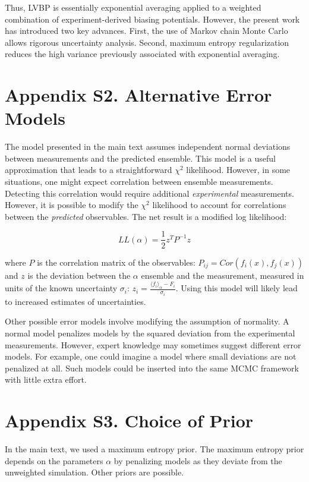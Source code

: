 \documentclass[journal=jacsat,manuscript=article]{achemso}
\begin{document}
Thus, LVBP is essentially exponential averaging applied to a weighted combination of experiment-derived biasing potentials.  However, the present work has introduced two key advances.  First, the use of Markov chain Monte Carlo allows rigorous uncertainty analysis.  Second, maximum entropy regularization reduces the high variance previously associated with exponential averaging.  

\section{Appendix S2.  Alternative Error Models}

The model presented in the main text assumes independent normal deviations between measurements and the predicted ensemble.  This model is a useful approximation that leads to a straightforward $\chi^2$ likelihood.  However, in some situations, one might expect correlation between ensemble measurements.  Detecting this correlation would require additional \emph{experimental} measurements.  However, it is possible to modify the $\chi^2$ likelihood to account for correlations between the \emph{predicted} observables.  The net result is a modified log likelihood:

$$L L(\alpha) = \frac{1}{2} z^T P^{-1} z$$

where $P$ is the correlation matrix of the observables: $P_{ij} = Cor(f_i(x), f_j(x))$ and $z$ is the deviation between the $\alpha$ ensemble and the measurement, measured in units of the known uncertainty $\sigma_i$: $z_i = \frac{\langle f_i\rangle _\alpha - F_i}{\sigma_i}$.  Using this model will likely lead to increased estimates of uncertainties.  

Other possible error models involve modifying the assumption of normality.  A normal model penalizes models by the squared deviation from the experimental measurements.  However, expert knowledge may sometimes suggest different error models.  For example, one could imagine a model where small deviations are not penalized at all.  Such models could be inserted into the same MCMC framework with little extra effort.


\section{Appendix S3.  Choice of Prior}

In the main text, we used a maximum entropy prior.  The maximum entropy prior depends on the parameters $\alpha$ by penalizing models as they deviate from the unweighted simulation.  Other priors are possible.  
\end{document}
